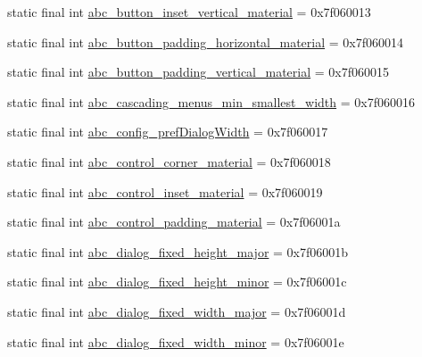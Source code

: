 \begin{DoxyCompactItemize}
\item 
static final int \mbox{\hyperlink{classandroid_1_1support_1_1design_1_1R_1_1dimen_a4f55256e84d9d47f13cf1553adbbb153}{abc\+\_\+button\+\_\+inset\+\_\+vertical\+\_\+material}} = 0x7f060013
\item 
static final int \mbox{\hyperlink{classandroid_1_1support_1_1design_1_1R_1_1dimen_adf85bcb0e234cbc7883e6d6e6dc005e3}{abc\+\_\+button\+\_\+padding\+\_\+horizontal\+\_\+material}} = 0x7f060014
\item 
static final int \mbox{\hyperlink{classandroid_1_1support_1_1design_1_1R_1_1dimen_a15726a35ff8b417641bbc00e360df277}{abc\+\_\+button\+\_\+padding\+\_\+vertical\+\_\+material}} = 0x7f060015
\item 
static final int \mbox{\hyperlink{classandroid_1_1support_1_1design_1_1R_1_1dimen_a407a24f2b9ce7bda68c742ab29c3860a}{abc\+\_\+cascading\+\_\+menus\+\_\+min\+\_\+smallest\+\_\+width}} = 0x7f060016
\item 
static final int \mbox{\hyperlink{classandroid_1_1support_1_1design_1_1R_1_1dimen_ada9bce90209861ef96ac780cc525730c}{abc\+\_\+config\+\_\+pref\+Dialog\+Width}} = 0x7f060017
\item 
static final int \mbox{\hyperlink{classandroid_1_1support_1_1design_1_1R_1_1dimen_a309e3353e64253f83debdb45d1449e74}{abc\+\_\+control\+\_\+corner\+\_\+material}} = 0x7f060018
\item 
static final int \mbox{\hyperlink{classandroid_1_1support_1_1design_1_1R_1_1dimen_a2be8e6d98d31e9f2a87de1071f804927}{abc\+\_\+control\+\_\+inset\+\_\+material}} = 0x7f060019
\item 
static final int \mbox{\hyperlink{classandroid_1_1support_1_1design_1_1R_1_1dimen_a8019524092bba937679a2feb43ed2dc0}{abc\+\_\+control\+\_\+padding\+\_\+material}} = 0x7f06001a
\item 
static final int \mbox{\hyperlink{classandroid_1_1support_1_1design_1_1R_1_1dimen_a02a2b42830c5c23e9403db9cf45abe99}{abc\+\_\+dialog\+\_\+fixed\+\_\+height\+\_\+major}} = 0x7f06001b
\item 
static final int \mbox{\hyperlink{classandroid_1_1support_1_1design_1_1R_1_1dimen_af720ae1061dfd45d7cd27ee4f430d417}{abc\+\_\+dialog\+\_\+fixed\+\_\+height\+\_\+minor}} = 0x7f06001c
\item 
static final int \mbox{\hyperlink{classandroid_1_1support_1_1design_1_1R_1_1dimen_a22df7a3a126ea5e7182c89eea23a604f}{abc\+\_\+dialog\+\_\+fixed\+\_\+width\+\_\+major}} = 0x7f06001d
\item 
static final int \mbox{\hyperlink{classandroid_1_1support_1_1design_1_1R_1_1dimen_a5ebbb09ad981216b76fae7ab30ad724b}{abc\+\_\+dialog\+\_\+fixed\+\_\+width\+\_\+minor}} = 0x7f06001e

\end{DoxyCompactItemize}
